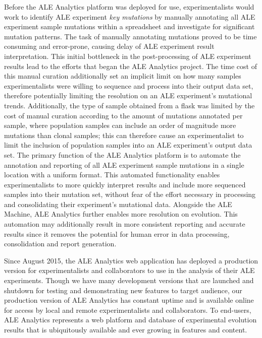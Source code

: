 \documentclass[12pt,final,masters,chapterheads]{ucsd}  %
\begin{document}
%
%
Before the ALE Analytics platform was deployed for use, experimentalists would work to identify ALE experiment \textit{key mutations} by manually annotating all ALE experiment sample mutations within a spreadsheet and investigate for significant mutation patterns. The task of manually annotating mutations proved to be time consuming and error-prone, causing delay of ALE experiment result interpretation. This initial bottleneck in the post-processing of ALE experiment results lead to the efforts that began the ALE Analytics project. The time cost of this manual curation additionally set an implicit limit on how many samples experimentalists were willing to sequence and process into their output data set, therefore potentially limiting the resolution on an ALE experiment's mutational trends. Additionally, the type of sample obtained from a flask was limited by the cost of manual curation according to the amount of mutations annotated per sample, where population samples can include an order of magnitude more mutations than clonal samples; this can therefore cause an experimentalist to limit the inclusion of population samples into an ALE experiment's output data set. The primary function of the ALE Analytics platform is to automate the annotation and reporting of all ALE experiment sample mutations in a single location with a uniform format. This automated functionality enables experimentalists to more quickly interpret results and include more sequenced samples into their mutation set, without fear of the effort necessary in processing and consolidating their experiment's mutational data. Alongside the ALE Machine, ALE Analytics further enables more resolution on evolution. This automation may additionally result in more consistent reporting and accurate results since it removes the potential for human error in data processing, consolidation and report generation.

Since August 2015, the ALE Analytics web application has deployed a production version for experimentalists and collaborators to use in the analysis of their ALE experiments. Though we have many development versions that are launched and shutdown for testing and demonstrating new features to target audience, our production version of ALE Analytics has constant uptime and is available online for access by local and remote experimentalists and collaborators. To end-users, ALE Analytics represents a web platform and database of experimental evolution results that is ubiquitously available and ever growing in features and content.
\end{document}
